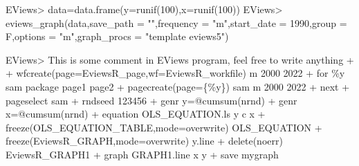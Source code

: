 \documentclass[
]{article}
\newenvironment{Shaded}{\begin{snugshade}}{\end{snugshade}}
\newcommand{\AttributeTok}[1]{\textcolor[rgb]{0.77,0.63,0.00}{#1}}
\newcommand{\DecValTok}[1]{\textcolor[rgb]{0.00,0.00,0.81}{#1}}
\newcommand{\FunctionTok}[1]{\textcolor[rgb]{0.00,0.00,0.00}{#1}}
\newcommand{\NormalTok}[1]{#1}
\newcommand{\OtherTok}[1]{\textcolor[rgb]{0.56,0.35,0.01}{#1}}
\newcommand{\SpecialCharTok}[1]{\textcolor[rgb]{0.00,0.00,0.00}{#1}}
\newcommand{\StringTok}[1]{\textcolor[rgb]{0.31,0.60,0.02}{#1}}
\begin{document}
\begin{Shaded}
\begin{Highlighting}[]
\NormalTok{EViews}\SpecialCharTok{\textgreater{}}\NormalTok{ data}\OtherTok{=}\FunctionTok{data.frame}\NormalTok{(}\AttributeTok{y=}\FunctionTok{runif}\NormalTok{(}\DecValTok{100}\NormalTok{),}\AttributeTok{x=}\FunctionTok{runif}\NormalTok{(}\DecValTok{100}\NormalTok{))}
\NormalTok{EViews}\SpecialCharTok{\textgreater{}} \FunctionTok{eviews\_graph}\NormalTok{(data,}\AttributeTok{save\_path =} \StringTok{""}\NormalTok{,}\AttributeTok{frequency =} \StringTok{"m"}\NormalTok{,}\AttributeTok{start\_date =} \DecValTok{1990}\NormalTok{,}\AttributeTok{group =}\NormalTok{ F,}\AttributeTok{options =} \StringTok{"m"}\NormalTok{,}\AttributeTok{graph\_procs =} \StringTok{"template eviews5"}\NormalTok{)}
\end{Highlighting}
\end{Shaded}

\begin{Shaded}
\end{Shaded}

\begin{Shaded}
\begin{Highlighting}[]
\NormalTok{EViews\textgreater{} \textquotesingle{}This is some comment in EViews program, feel free to write anything}
\NormalTok{+ }
\NormalTok{+ wfcreate(page=EviewsR\_page,wf=EviewsR\_workfile) m 2000 2022}
\NormalTok{+ for \%y sam package page1 page2}
\NormalTok{+ pagecreate(page=\{\%y\}) sam m 2000 2022}
\NormalTok{+ next}
\NormalTok{+ pageselect sam}
\NormalTok{+ rndseed 123456}
\NormalTok{+ genr y=@cumsum(nrnd)}
\NormalTok{+ genr x=@cumsum(nrnd)}
\NormalTok{+ equation OLS\_EQUATION.ls y c x}
\NormalTok{+ freeze(OLS\_EQUATION\_TABLE,mode=overwrite) OLS\_EQUATION}
\NormalTok{+ freeze(EviewsR\_GRAPH,mode=overwrite) y.line}
\NormalTok{+ delete(noerr) EviewsR\_GRAPH1}
\NormalTok{+ graph GRAPH1.line x y}
\NormalTok{+ save mygraph}
\end{Highlighting}
\end{Shaded}
\end{document}
